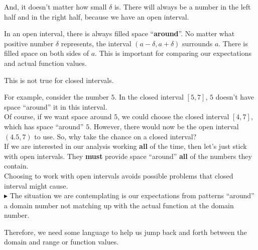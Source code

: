 \documentclass{ximera}
\begin{document}
And, it doesn't matter how small $\delta$ is.  There will always be a number in the left half and in the right half, because we have an open interval.


In an open interval, there is always filled space ``\textbf{\textcolor{purple!85!blue}{around}}''.  No matter what positive number $\delta$ represents, the interval $(a-\delta, a+\delta)$ surrounds $a$.  There is filled space on both sides of $a$. This is important for comparing our expectations and actual function values.





This is not true for closed intervals.


For example, consider the number $5$.  In the closed interval $[5, 7]$,  $5$ doesn't have space ``around'' it in this interval. \\

Of course, if we want space around $5$, we could choose the closed interval $[4,7]$, which has space ``around'' $5$.  However, there would now be the open interval $(4.5, 7)$ to use.  So, why take the chance on a closed interval?  \\

If we are interested in our analysis working \textbf{\textcolor{red!70!black}{all}} of the time, then let's just stick with open intervals.  They \textbf{must} provide space ``around'' \textbf{\textcolor{red!70!black}{all}} of the numbers they contain. \\

Choosing to work with open intervals avoids possible problems that closed interval might cause.\\






\textbf{\textcolor{red!70!darkgray}{$\blacktriangleright$}} The situation we are contemplating is our expectations from patterns ``around'' a domain number not matching up with the actual function at the domain number.

Therefore, we need some language to help us jump back and forth between the domain and range or function values.
\end{document}
